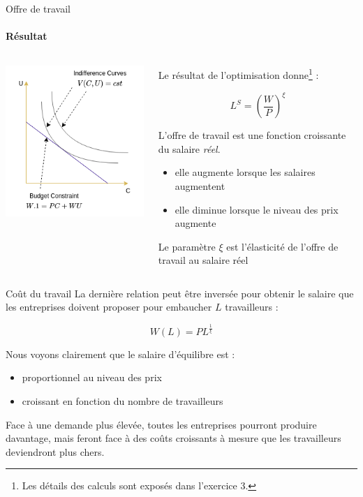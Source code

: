 \documentclass[
  ignorenonframetext,
  aspectratio=169,
]{beamer}
\providecommand{\tightlist}{%
  \setlength{\itemsep}{0pt}\setlength{\parskip}{0pt}}\usepackage{longtable,booktabs,array}
\begin{document}
\begin{frame}{Offre de travail}
\label{offre-de-travail-1}
\framesubtitle{Résultat}

\begin{columns}[T]
\begin{column}{0.4\textwidth}
\includegraphics{assets/optimization.png}
\end{column}

\begin{column}{0.6\textwidth}
Le résultat de l'optimisation
donne\footnote{Les détails des calculs sont exposés dans l'exercice 3.}
:

\[\boxed{L^S = \left(\frac{W}{P}\right)^\xi}\]

L'offre de travail est une fonction croissante du salaire \emph{réel}.

\begin{itemize}
\tightlist
\item
  elle augmente lorsque les salaires augmentent
\item
  elle diminue lorsque le niveau des prix augmente
\end{itemize}

Le paramètre \(\xi\) est l'élasticité de l'offre de travail au salaire
réel
\end{column}
\end{columns}
\end{frame}

\begin{frame}{Coût du travail}
\label{couxfbt-du-travail}
La dernière relation peut être inversée pour obtenir le salaire que les
entreprises doivent proposer pour embaucher \(L\) travailleurs :

\[W(L) = P L^{\frac{1}{\xi}}\]

Nous voyons clairement que le salaire d'équilibre est :

\begin{itemize}
\tightlist
\item
  proportionnel au niveau des prix
\item
  croissant en fonction du nombre de travailleurs
\end{itemize}

Face à une demande plus élevée, toutes les entreprises pourront produire
davantage, mais feront face à des coûts croissants à mesure que les
travailleurs deviendront plus chers.
\end{frame}
\end{document}
